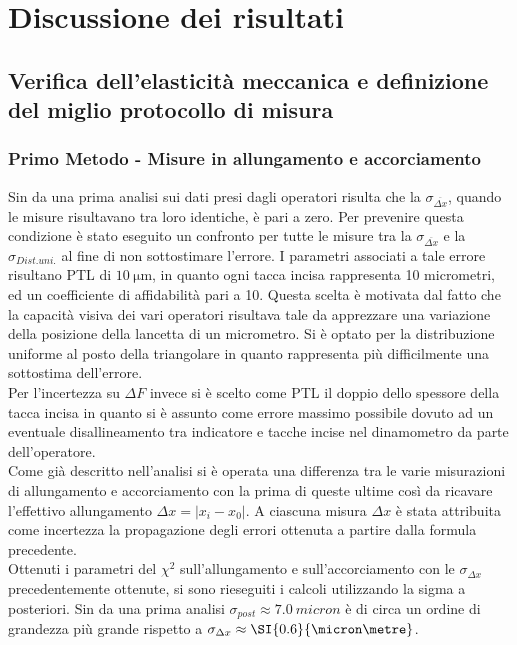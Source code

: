 \documentclass[a4paper,11pt,oneside]{article}
\begin{document}
\section{Discussione dei risultati}
\subsection{Verifica dell'elasticità meccanica e definizione del miglio protocollo di misura}\label{sec:discussione_prima_parte}
\subsubsection*{Primo Metodo - Misure in allungamento e accorciamento}
Sin da una prima analisi sui dati presi dagli operatori risulta che la $\sigma_{\overline{\Delta x}}$, quando le misure risultavano tra loro identiche, è pari a zero. Per prevenire questa condizione è stato eseguito un confronto per tutte le misure tra la $\sigma_{\overline{\Delta x}}$ e la $\sigma_{Dist. uni.}$ al fine di non sottostimare l'errore. I parametri associati a tale errore risultano PTL di $\SI{10}{\micro\metre}$, in quanto ogni tacca incisa rappresenta 10 micrometri, ed un coefficiente di affidabilità pari a 10. Questa scelta è motivata dal fatto che la capacità visiva dei vari operatori risultava tale da apprezzare una variazione della posizione della lancetta di un micrometro. Si è optato per la distribuzione uniforme al posto della triangolare in quanto rappresenta più difficilmente una sottostima dell'errore.\\
Per l'incertezza su $\Delta F$ invece si è scelto come PTL il doppio dello spessore della tacca incisa in quanto si è assunto come errore massimo possibile dovuto ad un eventuale disallineamento tra indicatore e tacche incise nel dinamometro da parte dell'operatore.\\

Come già descritto nell'analisi si è operata una differenza tra le varie misurazioni di allungamento e accorciamento con la prima di queste ultime così da ricavare l'effettivo allungamento $\Delta x=| x_{i}-x_{0}|$. A ciascuna misura $\Delta x$ è stata attribuita come incertezza la propagazione degli errori ottenuta a partire dalla formula precedente.\\

Ottenuti i parametri del ${\chi}^2$ sull'allungamento e sull'accorciamento con le $\sigma_{\Delta x}$ precedentemente ottenute, si sono rieseguiti i calcoli utilizzando la sigma a posteriori. Sin da una prima analisi $\sigma_{post} \approx \SI{7.0}{micron}$ è di circa un ordine di grandezza più grande rispetto a $\sigma_{\Delta x} \approx \SI{0.6}{\micron\metre}$.
\end{document}
